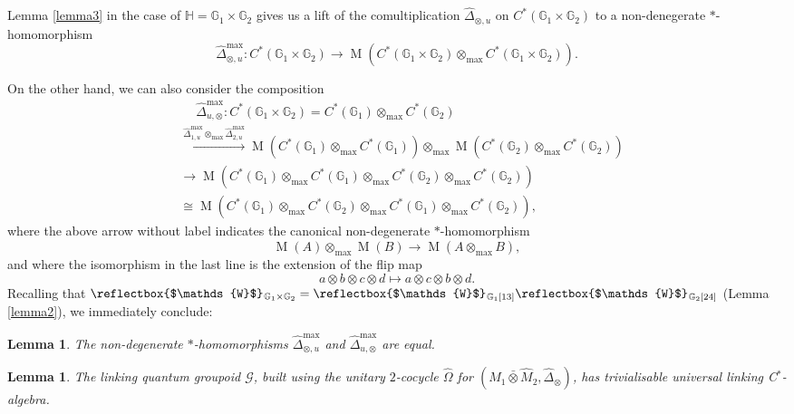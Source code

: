 \documentclass[reqno]{amsart}
\numberwithin{equation}{section}
\newtheorem{Lem}[Theorem]{Lemma}
\newcommand{\G}{\mathbb{G}}
\newcommand{\Hh}{\mathbb{H}}
\newcommand{\msG}{\mathscr{G}}
\newcommand{\Mult}{\operatorname{M}}
\newcommand{\Ww}{\mathds{W}}
\newcommand{\wW}{\text{\reflectbox{$\Ww$}}\:\!}
\begin{document}
Lemma \ref{lemma3} in the case of $\Hh=\G_1\times \G_2$ gives us a lift of the comultiplication $\hat{\Delta}_{\otimes,u}$ on $C^*(\G_1\times \G_2)$ to a non-denegerate $*$-homomorphism
\[
\hat{\Delta}_{\otimes,u}^{\max}\colon C^*(\G_1 \times \G_2)\rightarrow \Mult( 
C^*(\G_1 \times \G_2)\otimes_{\max}C^*(\G_1 \times \G_2)).
\]

On the other hand, we can also consider the composition
\[\begin{split}
&\quad\;
\hat{\Delta}^{\max}_{u,\otimes}\colon 
C^*(\G_1 \times \G_2)=C^*(\G_1)\otimes_{\max} C^*(\G_2)\\
&\xrightarrow[]{\hat{\Delta}^{\max}_{1,u}\otimes_{\max} \hat{\Delta}^{\max}_{2,u}}
\Mult(C^*(\G_1)\otimes_{\max} C^*(\G_1))
\otimes_{\max} \Mult( C^*(\G_2)\otimes_{\max} C^*(\G_2))\\
&\longrightarrow
\Mult( C^*(\G_1)\otimes_{\max} C^*(\G_1)\otimes_{\max} C^*(\G_2)\otimes_{\max} C^*(\G_2))\\
&\cong
\Mult( C^*(\G_1)\otimes_{\max} C^*(\G_2)\otimes_{\max} C^*(\G_1)\otimes_{\max} C^*(\G_2)),
\end{split}\]
where the above arrow without label indicates the canonical non-degenerate $*$-homomorphism 
\[
\Mult(A)\otimes_{\max} \Mult(B)\rightarrow \Mult(A\otimes_{\max} B),
\] 
and where the isomorphism in the last line is the extension of the flip map 
\[
a\otimes b\otimes c \otimes d\mapsto a\otimes c\otimes b\otimes d.
\] 
Recalling that $\wW_{\G_1\times \G_2}=\wW_{\G_1 [13]} \wW_{\G_2 [24]}$ (Lemma \ref{lemma2}), we immediately conclude:

\begin{Lem}\label{lemma4}
The non-degenerate $*$-homomorphisms $\hat{\Delta}^{\max}_{\otimes,u}$ and $\hat{\Delta}^{\max}_{u,\otimes }$ are equal.
\end{Lem}

\begin{Lem}\label{LemTrivialQG}
The linking quantum groupoid $\msG$, built using the unitary $2$-cocycle $\hat{\Omega}$ for $(\hat{M}_1\bar{\otimes}\hat{M}_2,\hat{\Delta}_{\otimes})$, has trivialisable universal linking C$^*$-algebra. 
\end{Lem} 
\end{document}
